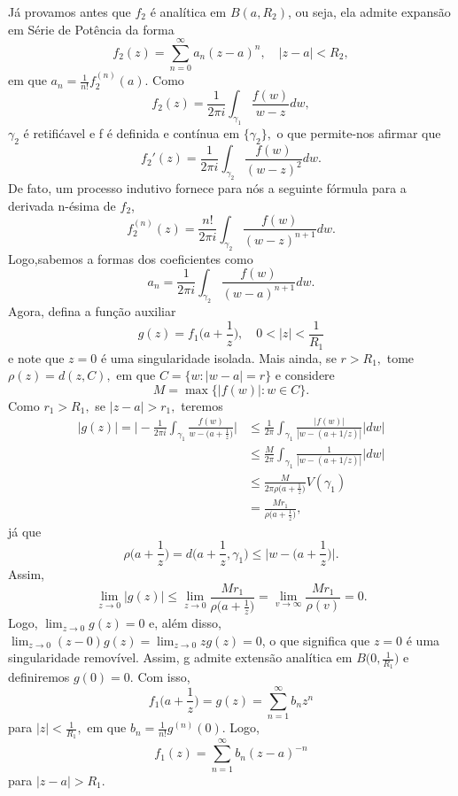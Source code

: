 \documentclass[complex.tex]{subfiles}
\begin{document}
\begin{proof*}
	Já provamos antes que \(f_{2}\) é analítica em \(B(a, R_{2})\), ou seja, ela admite expansão em Série de Potência da forma
	\[
		f_{2}(z) = \sum\limits_{n=0}^{\infty}a_{n}(z-a)^{n},\quad |z-a| < R_{2},
	\]
	em que \(a_{n} = \frac{1}{n!}f_{2}^{(n)}(a).\) Como
	\[
		f_{2}(z) = \frac{1}{2\pi i}\int_{\gamma _{1}}^{}\frac{f(w)}{w-z}dw,
	\]
	\(\gamma _{2}\) é retifićavel e f é definida e contínua em \(\{\gamma_{2}\},\) o que permite-nos afirmar que
	\[
		f_{2}'(z) = \frac{1}{2\pi i}\int_{\gamma_{2}}^{}\frac{f(w)}{(w-z)^{2}}dw.
	\]
	De fato, um processo indutivo fornece para nós a seguinte fórmula para a derivada n-ésima de \(f_{2}\),
	\[
		f_{2}^{(n)}(z) = \frac{n!}{2\pi i}\int_{\gamma _{2}}^{}\frac{f(w)}{(w-z)^{n+1}}dw.
	\]
	Logo,sabemos a formas dos coeficientes como
	\[
		a_{n} = \frac{1}{2\pi i}\int_{\gamma _{2}}^{}\frac{f(w)}{(w-a)^{n+1}}dw.
	\]
	Agora, defina a função auxiliar
	\[
		g(z) = f_{1}\biggl(a + \frac{1}{z}\biggr),\quad 0 < |z| < \frac{1}{R_{1}}
	\]
	e note que \(z=0\) é uma singularidade isolada. Mais ainda, se \(r > R_{1},\) tome \(\rho (z) = d(z, C),\)
	em que \(C = \{w: |w-a| = r\}\) e considere
	\[
		M = \max\{|f(w)|: w\in C\}.
	\]
	Como \(r_{1} >  R_{1},\) se \(|z-a| > r_{1},\) teremos
	\begin{align*}
		|g(z)| = \biggl|-\frac{1}{2\pi i}\int_{\gamma _{1}}^{}\frac{f(w)}{w-\bigl(a + \frac{1}{z}\bigr)}\biggr| & \leq \frac{1}{2\pi }\int_{\gamma _{1}}^{}\frac{|f(w)|}{|w - (a+1/z)|}|dw| \\
		                                                                                                        & \leq \frac{M}{2\pi }\int_{\gamma _{1}}^{}\frac{1}{|w-(a+1/z)|}|dw|        \\
		                                                                                                        & \leq \frac{M}{2\pi \rho \bigl(a+\frac{1}{z}\bigr)}V(\gamma _{1})          \\
		                                                                                                        & = \frac{Mr_{1}}{\rho \bigl(a + \frac{1}{z}\bigr)},
	\end{align*}
	já que
	\[
		\rho \biggl(a + \frac{1}{z}\biggr) = d \biggl(a + \frac{1}{z}, \gamma _{1}\biggr) \leq \biggl\vert w-\biggl(a + \frac{1}{z}\biggr)\biggr\vert.
	\]
	Assim,
	\[
		\lim_{z\to 0}|g(z)|\leq \lim_{z\to 0}\frac{Mr_{1}}{\rho \bigl(a + \frac{1}{z}\bigr)} = \lim_{v\to \infty}\frac{Mr_{1}}{\rho (v)}=0.
	\]
	Logo, \(\lim_{z\to 0}g(z) = 0\) e, além disso, \(\lim_{z\to 0}(z-0)g(z)=\lim_{z\to 0}zg(z) = 0\), o que significa que \(z=0\) é uma singularidade
	removível. Assim, g admite extensão analítica em \(B \biggl(0, \frac{1}{R_{1}}\biggr)\) e definiremos \(g(0) = 0.\) Com isso,
	\[
		f_{1}\biggl(a + \frac{1}{z}\biggr)=g(z) = \sum\limits_{n=1}^{\infty}b_{n}z^{n}
	\]
	para \(|z| < \frac{1}{R_{1}},\) em que \(b_{n} = \frac{1}{n!}g^{(n)}(0).\) Logo,
	\[
		f_{1}(z) = \sum\limits_{n=1}^{\infty}b_{n}(z-a)^{-n}
	\]
	para \(|z-a| > R_{1}.\)


\end{proof*}
\end{document}
